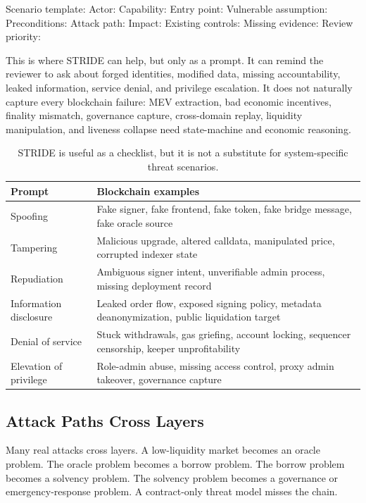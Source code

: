 \begin{codeblock}
Scenario template:
    Actor:
    Capability:
    Entry point:
    Vulnerable assumption:
    Preconditions:
    Attack path:
    Impact:
    Existing controls:
    Missing evidence:
    Review priority:
\end{codeblock}

This is where STRIDE can help, but only as a prompt. It can remind the reviewer to ask about forged identities, modified data, missing accountability, leaked information, service denial, and privilege escalation. It does not naturally capture every blockchain failure: MEV extraction, bad economic incentives, finality mismatch, governance capture, cross-domain replay, liquidity manipulation, and liveness collapse need state-machine and economic reasoning.

\begin{table}[htbp]
\centering
\small
\renewcommand{\arraystretch}{1.18}
\begin{tabularx}{\textwidth}{@{}>{\RaggedRight\arraybackslash}p{}X@{}}
\toprule
Prompt & Blockchain examples \\
\midrule
Spoofing & Fake signer, fake frontend, fake token, fake bridge message, fake oracle source \\
Tampering & Malicious upgrade, altered calldata, manipulated price, corrupted indexer state \\
Repudiation & Ambiguous signer intent, unverifiable admin process, missing deployment record \\
Information disclosure & Leaked order flow, exposed signing policy, metadata deanonymization, public liquidation target \\
Denial of service & Stuck withdrawals, gas griefing, account locking, sequencer censorship, keeper unprofitability \\
Elevation of privilege & Role-admin abuse, missing access control, proxy admin takeover, governance capture \\
\bottomrule
\end{tabularx}
\caption{STRIDE is useful as a checklist, but it is not a substitute for system-specific threat scenarios.}
\end{table}

\subsection{Attack Paths Cross Layers}

Many real attacks cross layers. A low-liquidity market becomes an oracle problem. The oracle problem becomes a borrow problem. The borrow problem becomes a solvency problem. The solvency problem becomes a governance or emergency-response problem. A contract-only threat model misses the chain.

